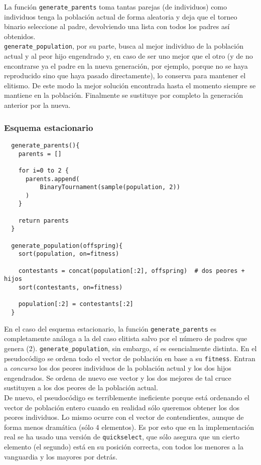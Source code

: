 \documentclass[11pt]{article}
\theoremstyle{plain}
\theoremstyle{definition}
\begin{document}
La función \texttt{generate\_parents} toma tantas parejas (de individuos) como individuos tenga la población actual de forma aleatoria y deja que el torneo binario seleccione al padre, devolviendo una lista con todos los padres así obtenidos. \\

\texttt{generate\_population}, por su parte, busca al mejor individuo de la población actual y al peor hijo engendrado y, en caso de ser uno mejor que el otro (y de no encontrarse ya el padre en la nueva generación, por ejemplo, porque no se haya reproducido sino que haya pasado directamente), lo conserva para mantener el elitismo. De este modo la mejor solución encontrada hasta el momento siempre se mantiene en la población. Finalmente se sustituye por completo la generación anterior por la nueva. \\

\subsubsection{Esquema estacionario}
\begin{lstlisting}
  generate_parents(){
    parents = []

    for i=0 to 2 {
      parents.append(
          BinaryTournament(sample(population, 2))
      )
    }

    return parents
  }

  generate_population(offspring){
    sort(population, on=fitness)

    contestants = concat(population[:2], offspring)  # dos peores + hijos
    sort(contestants, on=fitness)

    population[:2] = contestants[:2]
  }
\end{lstlisting}

En el caso del esquema estacionario, la función \texttt{generate\_parents} es completamente análoga a la del caso elitista salvo por el número de padres que genera (2). \texttt{generate\_population}, sin embargo, sí es esencialmente distinta. En el pseudocódigo se ordena todo el vector de población en base a su \texttt{fitness}. Entran a \textit{concurso} los dos peores individuos de la población actual y los dos hijos engendrados. Se ordena de nuevo ese vector y los dos mejores de tal cruce sustituyen a los dos peores de la población actual. \\

De nuevo, el pseudocódigo es terriblemente ineficiente porque está ordenando el vector de población entero cuando en realidad sólo queremos obtener los dos peores individuos. Lo mismo ocurre con el vector de contendientes, aunque de forma menos dramática (sólo 4 elementos). Es por esto que en la implementación real se ha usado una versión de \texttt{quickselect}, que sólo asegura que un cierto elemento (el segundo) está en su posición correcta, con todos los menores a la vanguardia y los mayores por detrás. \\
\end{document}
